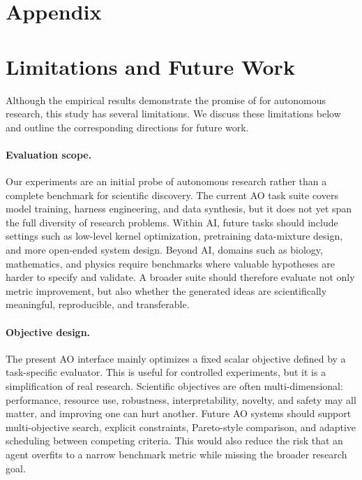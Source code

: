 \section*{Appendix}
\label{app:contents}
\providecommand{\ours}{\arbor}
\startcontents[sections]
\setupappendixtoc
{\hypersetup{linkcolor=AppendixTOCSection}
}

\section{Limitations and Future Work}
\label{app:limitations-future}

Although the empirical results demonstrate the promise of \arbor{} for
autonomous research, this study has several limitations. We discuss these
limitations below and outline the corresponding directions for future work.

\paragraph{Evaluation scope.}
Our experiments are an initial probe of autonomous research rather than a
complete benchmark for scientific discovery. The current AO task suite covers
model training, harness engineering, and data synthesis, but it does not yet
span the full diversity of research problems. Within AI, future tasks should
include settings such as low-level kernel optimization, pretraining data-mixture
design, and more open-ended system design. Beyond AI, domains such as biology,
mathematics, and physics require benchmarks where valuable hypotheses are harder
to specify and validate. A broader suite should therefore evaluate not only
metric improvement, but also whether the generated ideas are scientifically
meaningful, reproducible, and transferable.

\paragraph{Objective design.}
The present AO interface mainly optimizes a fixed scalar objective defined by a
task-specific evaluator. This is useful for controlled experiments, but it is a
simplification of real research. Scientific objectives are often multi-dimensional:
performance, resource use, robustness, interpretability, novelty, and safety may
all matter, and improving one can hurt another. Future AO systems should support
multi-objective search, explicit constraints, Pareto-style comparison, and
adaptive scheduling between competing criteria. This would also reduce the risk
that an agent overfits to a narrow benchmark metric while missing the broader
research goal.


